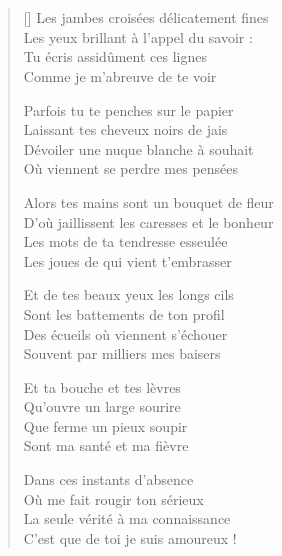 \section{\hfill}

\settowidth{\versewidth}{D'où jaillissent les caresses et le bonheur}
\begin{verse}[\versewidth]
Les jambes croisées délicatement fines \\
Les yeux brillant à l'appel du savoir : \\
Tu écris assidûment ces lignes \\
Comme je m'abreuve de te voir

Parfois tu te penches sur le papier \\
Laissant tes cheveux noirs de jais \\
Dévoiler une nuque blanche à souhait \\
Où viennent se perdre mes pensées

Alors tes mains sont un bouquet de fleur \\
D'où jaillissent les caresses et le bonheur \\
Les mots de ta tendresse esseulée \\
Les joues de qui vient t'embrasser

Et de tes beaux yeux les longs cils \\
Sont les battements de ton profil \\
Des écueils où viennent s'échouer \\
Souvent par milliers mes baisers

Et ta bouche et tes lèvres \\
Qu'ouvre un large sourire \\
Que ferme un pieux soupir \\
Sont ma santé et ma fièvre

\newpage

Dans ces instants d'absence \\
Où me fait rougir ton sérieux \\
La seule vérité à ma connaissance \\
C'est que de toi je suis amoureux !
\end{verse}


